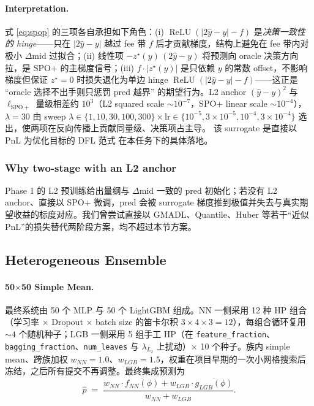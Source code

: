 \documentclass[11pt]{article}
\begin{document}
\paragraph{Interpretation.}
式 \eqref{eq:spop} 的三项各自承担如下角色：(i) $\operatorname{ReLU}(|2\hat y - y| - f)$ 是\emph{决策一致性的 hinge}——只在 $|2\hat y - y|$ 越过 fee 带 $f$ 后才贡献梯度，结构上避免在 fee 带内对极小 $\Delta$mid 过拟合；(ii) 线性项 $-z^{\star}(y)\,(2\hat y - y)$ 将预测向 oracle 决策方向拉，是 SPO+ 的主梯度信号；(iii) $f\cdot |z^{\star}(y)|$ 是只依赖 $y$ 的常数 offset，不影响梯度但保证 $z^{\star}=0$ 时损失退化为单边 hinge $\operatorname{ReLU}(|2\hat y - y| - f)$——这正是 ``oracle 选择不出手则只惩罚 pred 越界'' 的期望行为。L2 anchor $(\hat y - y)^2$ 与 $\ell_{\mathrm{SPO+}}$ 量级相差约 $10^{3}$（L2 squared scale $\sim 10^{-7}$，SPO+ linear scale $\sim 10^{-4}$），$\lambda=30$ 由 sweep $\lambda\in\{1,10,30,100,300\}\times\mathrm{lr}\in\{10^{-5},3\!\times\!10^{-5},10^{-4},3\!\times\!10^{-4}\}$ 选出，使两项在反向传播上贡献同量级、决策项占主导。
该 surrogate 是直接以 PnL 为优化目标的 DFL 范式 \cite{spo_plus,moody_saffell} 在本任务下的具体落地。

\subsubsection*{Why two-stage with an L2 anchor}
Phase 1 的 L2 预训练给出量纲与 $\Delta$mid 一致的 pred 初始化；若没有 L2 anchor、直接以 SPO+ 微调，pred 会被 surrogate 梯度推到极值并失去与真实期望收益的标度对应。我们曾尝试直接以 GMADL、Quantile、Huber 等若干``近似 PnL''的损失替代两阶段方案，均不超过本节方案。

\subsection{Heterogeneous Ensemble}
\label{sec:ens}

\paragraph{50$\times$50 Simple Mean.}
最终系统由 50 个 MLP 与 50 个 LightGBM 组成。NN 一侧采用 12 种 HP 组合（学习率 $\times$ Dropout $\times$ batch size 的笛卡尔积 $3\!\times\!4\!\times\!3=12$），每组合循环复用 $\sim 4$ 个随机种子；LGB 一侧采用 5 组手工 HP（在 \texttt{feature\_fraction}、\texttt{bagging\_fraction}、\texttt{num\_leaves} 与 $\lambda_{L_2}$ 上扰动）$\times$ 10 个种子。族内 simple mean、跨族加权 $w_{NN}{=}1.0$、$w_{LGB}{=}1.5$，权重在项目早期的一次小网格搜索后冻结，之后所有提交不再调整。最终集成预测为
\begin{equation}
\hat p \;=\; \frac{w_{NN}\cdot\overline{f_{NN}(\phi)} + w_{LGB}\cdot\overline{g_{LGB}(\phi)}}{w_{NN}+w_{LGB}}.
\end{equation}
\end{document}
